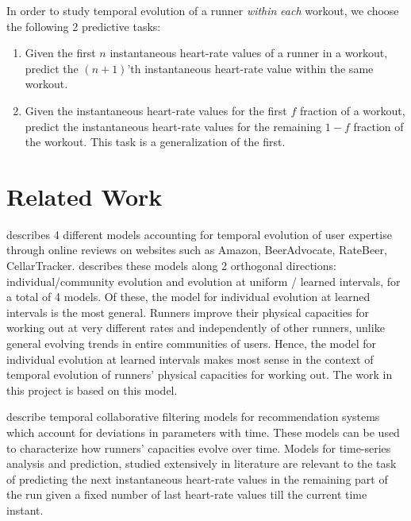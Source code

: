 \documentclass{acm_proc_article-sp}
\begin{document}
In order to study temporal evolution of a runner \emph{within} \emph{each} workout, we choose the following 2 predictive tasks:

\begin{enumerate}
\item Given the first $n$ instantaneous heart-rate values of a runner in a workout, predict the $(n+1)$'th instantaneous heart-rate value within the same workout.
\item Given the instantaneous heart-rate values for the first $f$ fraction of a workout, predict the instantaneous heart-rate values for the remaining $1-f$ fraction of the workout. This task is a generalization of the first.
\end{enumerate}

\section{Related Work}
\label{secRelatedWork}
\cite{www13} describes 4 different models accounting for temporal evolution of user expertise through online reviews on websites such as Amazon, BeerAdvocate, RateBeer, CellarTracker. \cite{www13} describes these models along 2 orthogonal directions: individual/community evolution and evolution at uniform / learned intervals, for a total of 4 models. Of these, the model for individual evolution at learned intervals is the most general. Runners improve their physical capacities for working out at very different rates and independently of other runners, unlike general evolving trends in entire communities of users. Hence, the model for individual evolution at learned intervals makes most sense in the context of temporal evolution of runners' physical capacities for working out. The work in this project is based on this model.


\cite{koren1, xiong} describe temporal collaborative filtering models for recommendation systems which account for deviations in parameters with time. These models can be used to characterize how runners' capacities evolve over time. Models for time-series analysis and prediction, studied extensively in literature \cite{timeSeriesStudy, timeSeriesSurvey, autoRegressiveModelWiki} are relevant to the task of predicting the next instantaneous heart-rate values in the remaining part of the run given a fixed number of last heart-rate values till the current time instant.
\end{document}
